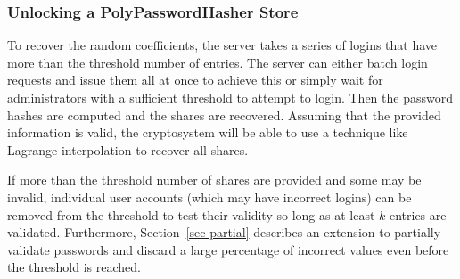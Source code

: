 \subsubsection{Unlocking a PolyPasswordHasher Store}

To recover the random coefficients, the server takes a series of logins that 
have more than the threshold number of entries.   
The server can either batch login requests and issue them all at once to
achieve this or simply wait for administrators with a sufficient threshold to 
attempt to login.   Then the password hashes are computed and the shares
are recovered.   Assuming that the provided information is valid, the 
cryptosystem will be able to use a technique like Lagrange interpolation to
recover all shares.

If more than the threshold number of shares are provided and some may be
invalid, individual user accounts (which may have 
incorrect logins) can be removed from the threshold to test their validity
so long as at least $k$ entries are validated.   %
Furthermore, 
Section~\ref{sec-partial} describes an extension to partially validate 
passwords and discard a large percentage of incorrect values even before 
the threshold is reached.


